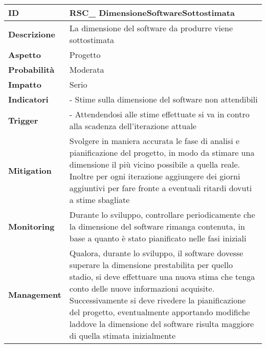 \begin{tabular}{|p{2.2cm}|p{9.6cm}| }
	\hline
   \textbf{ID} & RSC\_ DimensioneSoftwareSottostimata\\ [0.5ex] 
   \hline
   \textbf{Descrizione} & La dimensione del software da produrre viene sottostimata \\ 
   \hline
   \textbf{Aspetto} &  Progetto \\
   \hline
   \textbf{Probabilità} & Moderata\\ 
   \hline
   \textbf{Impatto} & Serio\\
	\hline
	\textbf{Indicatori} & - Stime sulla dimensione del software non attendibili \\
	\hline
	\textbf{Trigger} & - Attendendosi alle stime effettuate si va in contro alla scadenza dell'iterazione attuale\\
   \hline
   \textbf{Mitigation} & Svolgere in maniera accurata le fase di analisi e pianificazione del progetto, in modo da stimare una dimensione il più vicino possibile a quella reale. Inoltre per ogni iterazione aggiungere dei giorni aggiuntivi per fare fronte a eventuali ritardi dovuti a stime sbagliate \\ 
   \hline
   \textbf{Monitoring} & Durante lo sviluppo, controllare periodicamente che la dimensione del software rimanga contenuta, in base a quanto è stato pianificato nelle fasi iniziali\\ 
   \hline
   \textbf{Management} & Qualora, durante lo sviluppo, il software dovesse superare la dimensione prestabilita per quello stadio, si deve effettuare una nuova stima che tenga conto delle nuove informazioni acquisite. Successivamente si deve rivedere la pianificazione del progetto, eventualmente apportando modifiche laddove la dimensione del software risulta maggiore di quella stimata inizialmente \\ 
   \hline
\end{tabular}

